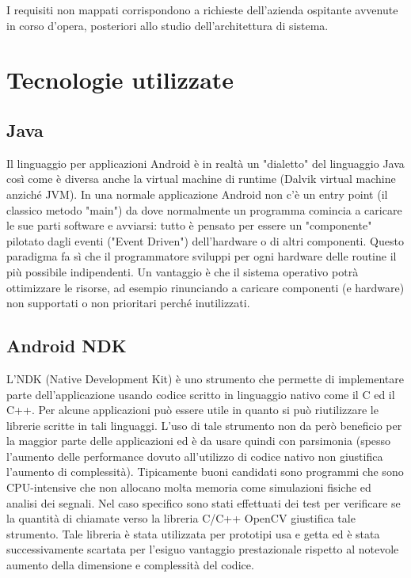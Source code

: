 I requisiti non mappati corrispondono a richieste dell'azienda ospitante avvenute in corso d'opera, posteriori allo studio dell'architettura di sistema.

\section{Tecnologie utilizzate}

\subsection{Java}

Il linguaggio per applicazioni Android è in realtà un "dialetto" del linguaggio Java così come è diversa anche la virtual machine di runtime (Dalvik virtual machine anziché JVM).
In una normale applicazione Android non c'è un entry point (il classico metodo "main") da dove normalmente un programma comincia a caricare le sue parti software e avviarsi: tutto è pensato per essere un "componente" pilotato dagli eventi ("Event Driven") dell'hardware o di altri componenti. Questo paradigma fa sì che il programmatore sviluppi per ogni hardware delle routine il più possibile indipendenti. Un vantaggio è che il sistema operativo potrà ottimizzare le risorse, ad esempio rinunciando a caricare componenti (e hardware) non supportati o non prioritari perché inutilizzati.

\subsection{Android NDK}

L'NDK (Native Development Kit) è uno strumento che permette di implementare parte dell'applicazione usando codice scritto in linguaggio nativo come il C ed il C++. Per alcune applicazioni può essere utile in quanto si può riutilizzare le librerie scritte in tali linguaggi. L'uso di tale strumento non da però beneficio per la maggior parte delle applicazioni ed è da usare quindi con parsimonia (spesso l'aumento delle performance dovuto all'utilizzo di codice nativo non giustifica l'aumento di complessità). Tipicamente buoni candidati sono programmi che sono CPU-intensive che non allocano molta memoria come simulazioni fisiche ed analisi dei segnali. Nel caso specifico sono stati effettuati dei test per verificare se la quantità di chiamate verso la libreria C/C++ OpenCV giustifica tale strumento. Tale libreria è stata utilizzata per prototipi usa e getta ed è stata successivamente scartata per l'esiguo vantaggio prestazionale rispetto al notevole aumento della dimensione e complessità del codice.

